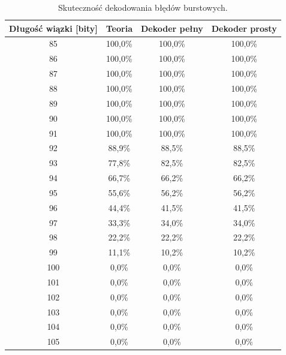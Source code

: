 \begin{table}[h]
\centering
\begin{tabular}{cccc}
\toprule
Długość wiązki [bity] & Teoria & Dekoder pełny & Dekoder prosty \\
\midrule
85 & 100,0\% & 100,0\% & 100,0\% \\
86 & 100,0\% & 100,0\% & 100,0\% \\
87 & 100,0\% & 100,0\% & 100,0\% \\
88 & 100,0\% & 100,0\% & 100,0\% \\
89 & 100,0\% & 100,0\% & 100,0\% \\
90 & 100,0\% & 100,0\% & 100,0\% \\
91 & 100,0\% & 100,0\% & 100,0\% \\
92 & 88,9\% & 88,5\% & 88,5\% \\
93 & 77,8\% & 82,5\% & 82,5\% \\
94 & 66,7\% & 66,2\% & 66,2\% \\
95 & 55,6\% & 56,2\% & 56,2\% \\
96 & 44,4\% & 41,5\% & 41,5\% \\
97 & 33,3\% & 34,0\% & 34,0\% \\
98 & 22,2\% & 22,2\% & 22,2\% \\
99 & 11,1\% & 10,2\% & 10,2\% \\
100 & 0,0\% & 0,0\% & 0,0\% \\
101 & 0,0\% & 0,0\% & 0,0\% \\
102 & 0,0\% & 0,0\% & 0,0\% \\
103 & 0,0\% & 0,0\% & 0,0\% \\
104 & 0,0\% & 0,0\% & 0,0\% \\
105 & 0,0\% & 0,0\% & 0,0\% \\
\bottomrule
\end{tabular}
\caption{Skuteczność dekodowania błędów burstowych.}
\label{tab:burst_results}
\end{table}

